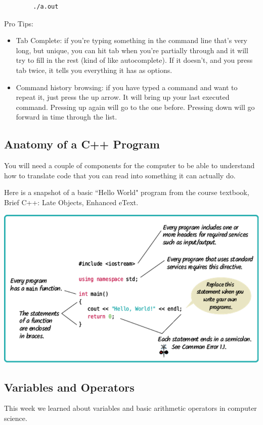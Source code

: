 \begin{verbatim}
        ./a.out
\end{verbatim}

Pro Tips:
\begin{itemize}
    \item Tab Complete: if you're typing something in the command line that’s very long, but unique, you can hit tab when you're partially through and it will try to fill in the rest (kind of like autocomplete). If it doesn't, and you press tab twice, it tells you everything it has as options.
    \item Command history browsing: if you have typed a command and want to repeat it, just press the up arrow. It will bring up your last executed command. Pressing up again will go to the one before. Pressing down will go forward in time through the list.
\end{itemize}

\subsection{Anatomy of a C++ Program}

You will need a couple of components for the computer to be able to understand how to translate code that you can read into something it can actually do. 

Here is a snapshot of a basic ``Hello World" program from the course textbook,  Brief C++: Late Objects, Enhanced eText. 

\includegraphics[width=\textwidth]{images/hello_world_16.png}

\subsection{Variables and Operators}
This week we learned about variables and basic arithmetic operators in computer science. 

